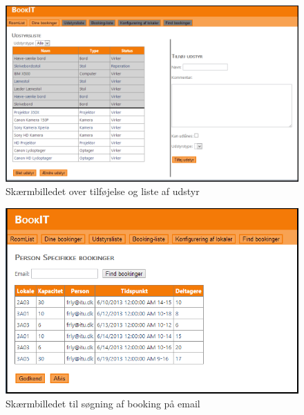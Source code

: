 \begin{figure}[h!]
  \centering
    \includegraphics[angle=90, height=\textheight]{Appendix/GUI-Prototype/DigitalMockup/UdstyrsListe}
  \caption{Skærmbilledet over tilføjelse og liste af udstyr}
\label{App_GUI_final_UdstyrsListe}
\end{figure}

\begin{figure}[h!]
  \centering
    \includegraphics[angle=90, height=\textheight]{Appendix/GUI-Prototype/DigitalMockup/SpecifikBookingListe}
  \caption{Skærmbilledet til søgning af booking på email}
\label{App_GUI_final_SpecifikBookingListe}
\end{figure}

